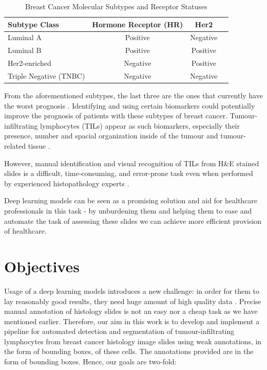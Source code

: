 \begin{table}[ht]
    \centering
    \caption{Breast Cancer Molecular Subtypes and Receptor Statuses}
    \label{tab:breast_cancer_subtypes}
    \begin{tabular}{|l|c|c|c|}
        \hline
        \textbf{Subtype Class} & \textbf{Hormone Receptor (HR)} & \textbf{Her2} \\
        \hline
        Luminal A & Positive & Negative \\
        \hline
        Luminal B & Positive & Positive \\
        \hline
        Her2-enriched & Negative & Positive \\
        \hline
        Triple Negative (TNBC) & Negative & Negative \\
        \hline
    \end{tabular}
\end{table}

From the aforementioned subtypes, the last three are the ones that currently have the worst prognosis \cite{Schalper2022, Zhang2024}. Identifying and using certain biomarkers could potentially improve the prognosis of patients with these subtypes of breast cancer. Tumour-infiltrating lymphocytes (TILs) appear as such biomarkers, especially their presence, number and spacial organization inside of the tumour and tumour-related tissue \cite{Salgado2015, Denkert2018, Amgad2019}.

However, manual identification and visual recognition of TILs from H\&E stained slides is a difficult, time-consuming, and error-prone task even when performed by experienced histopathology experts \cite{Salgado2015, Amgad2019}.

Deep learning models can be seen as a promising solution and aid for healthcare professionals in this task - by unburdening them and helping them to ease and automate the task of assessing these slides we can achieve more efficient provision of healthcare.

\section{Objectives}
Usage of a deep learning models introduces a new challenge: in order for them to lay reasonably good results, they need huge amount of high quality data \cite{}. Precise manual annotation of histology slides is not an easy nor a cheap task as we have mentioned earlier. Therefore, our aim in this work is to develop and implement a pipeline for automated detection and segmentation of tumour-infiltrating lymphocytes from breast cancer histology image slides using weak annotations, in the form of bounding boxes, of these cells. The annotations provided are in the form of bounding boxes. Hence, our goals are two-fold:

